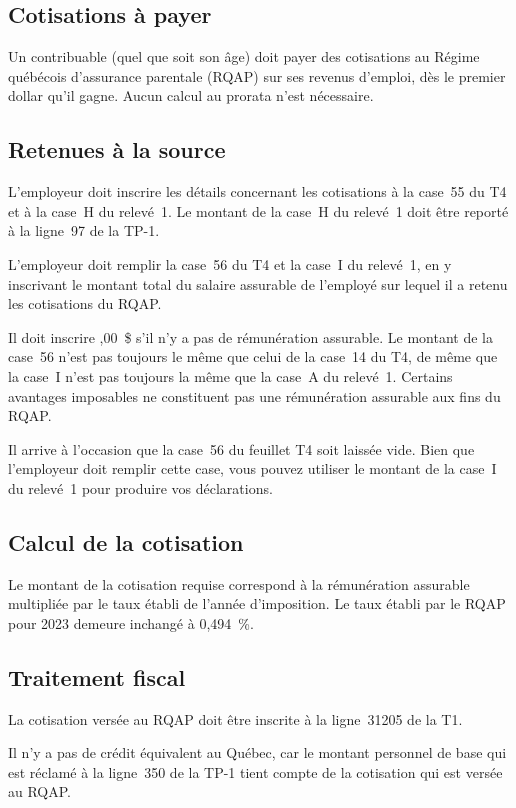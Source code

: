 \subsection{Cotisations à payer}
Un contribuable (quel que soit son âge) doit payer des cotisations au Régime québécois d'assurance parentale (RQAP) sur ses revenus d'emploi, dès le premier dollar qu'il gagne. Aucun calcul au prorata n'est nécessaire.


\subsection{Retenues à la source}
L'employeur doit inscrire les détails concernant les cotisations à la case~55 du T4 et à la case~H du relevé~1. Le montant de la case~H du relevé~1 doit être reporté à la ligne~97 de la
TP-1.

L'employeur doit remplir la case~56 du T4 et la case~I du relevé~1, en y inscrivant le montant total du salaire assurable de l'employé sur lequel il a retenu les cotisations du RQAP. 

Il doit inscrire ,00~\$ \fg{} s'il n'y a pas de rémunération assurable. Le montant de la case~56 n'est pas toujours le même que celui de la case~14 du T4, de même que la case~I n'est pas toujours la même que la case~A du relevé~1. Certains avantages imposables ne constituent pas une rémunération assurable aux fins du RQAP.

Il arrive à l'occasion que la case~56 du feuillet T4 soit laissée vide. Bien que l'employeur doit remplir cette case, vous pouvez utiliser le montant de la case~I du relevé~1 pour produire vos déclarations.


\subsection{Calcul de la cotisation}
Le montant de la cotisation requise correspond à la rémunération assurable multipliée par le taux établi de l'année d'imposition. Le taux établi par le RQAP pour 2023 demeure inchangé à 0,494~\%. 


\subsection{Traitement fiscal}
La cotisation versée au RQAP doit être inscrite à la ligne~31205 de la T1.

Il n'y a pas de crédit équivalent au Québec, car le montant personnel de base qui est réclamé à la ligne~350 de la TP-1 tient compte de la cotisation qui est versée au RQAP.

